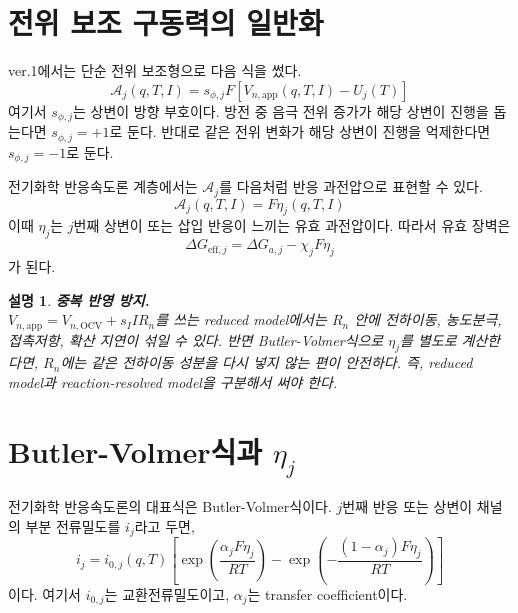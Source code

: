 \documentclass[11pt,a4paper]{article}
\newtheorem*{note}{설명}
\newcommand{\OCV}{\mathrm{OCV}}
\newcommand{\app}{\mathrm{app}}
\newcommand{\eff}{\mathrm{eff}}
\begin{document}
\section{전위 보조 구동력의 일반화}
ver.1에서는 단순 전위 보조형으로 다음 식을 썼다.
\begin{equation}
\mathcal A_j(q,T,I)=s_{\phi,j}F\left[V_{n,\app}(q,T,I)-U_j(T)\right]
\label{eq:v3_A_simple}
\end{equation}
여기서 \(s_{\phi,j}\)는 상변이 방향 부호이다. 방전 중 음극 전위 증가가 해당 상변이 진행을 돕는다면 \(s_{\phi,j}=+1\)로 둔다. 반대로 같은 전위 변화가 해당 상변이 진행을 억제한다면 \(s_{\phi,j}=-1\)로 둔다.

전기화학 반응속도론 계층에서는 \(\mathcal A_j\)를 다음처럼 반응 과전압으로 표현할 수 있다.
\begin{equation}
\mathcal A_j(q,T,I)=F\eta_j(q,T,I)
\label{eq:v3_A_eta}
\end{equation}
이때 \(\eta_j\)는 \(j\)번째 상변이 또는 삽입 반응이 느끼는 유효 과전압이다. 따라서 유효 장벽은
\begin{equation}
\Delta G_{\eff,j}=\Delta G_{a,j}-\chi_jF\eta_j
\label{eq:v3_Geff_eta}
\end{equation}
가 된다.

\begin{note}
\textbf{중복 반영 방지.} \\
\(V_{n,\app}=V_{n,\OCV}+s_IIR_n\)를 쓰는 reduced model에서는 \(R_n\) 안에 전하이동, 농도분극, 접촉저항, 확산 지연이 섞일 수 있다. 반면 Butler-Volmer식으로 \(\eta_j\)를 별도로 계산한다면, \(R_n\)에는 같은 전하이동 성분을 다시 넣지 않는 편이 안전하다. 즉, reduced model과 reaction-resolved model을 구분해서 써야 한다.
\end{note}

\section{Butler-Volmer식과 \texorpdfstring{\(\eta_j\)}{eta j}}
전기화학 반응속도론의 대표식은 Butler-Volmer식이다. \(j\)번째 반응 또는 상변이 채널의 부분 전류밀도를 \(i_j\)라고 두면,
\begin{equation}
i_j=i_{0,j}(q,T)
\left[
\exp\left(\frac{\alpha_jF\eta_j}{RT}\right)
-
\exp\left(-\frac{(1-\alpha_j)F\eta_j}{RT}\right)
\right]
\label{eq:v3_BV_general}
\end{equation}
이다. 여기서 \(i_{0,j}\)는 교환전류밀도이고, \(\alpha_j\)는 transfer coefficient이다.
\end{document}
